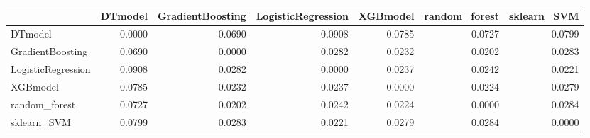 \begin{tabular}{lrrrrrr}
\toprule
 & DTmodel & GradientBoosting & LogisticRegression & XGBmodel & random_forest & sklearn_SVM \\
\midrule
DTmodel & 0.0000 & 0.0690 & 0.0908 & 0.0785 & 0.0727 & 0.0799 \\
GradientBoosting & 0.0690 & 0.0000 & 0.0282 & 0.0232 & 0.0202 & 0.0283 \\
LogisticRegression & 0.0908 & 0.0282 & 0.0000 & 0.0237 & 0.0242 & 0.0221 \\
XGBmodel & 0.0785 & 0.0232 & 0.0237 & 0.0000 & 0.0224 & 0.0279 \\
random_forest & 0.0727 & 0.0202 & 0.0242 & 0.0224 & 0.0000 & 0.0284 \\
sklearn_SVM & 0.0799 & 0.0283 & 0.0221 & 0.0279 & 0.0284 & 0.0000 \\
\bottomrule
\end{tabular}
